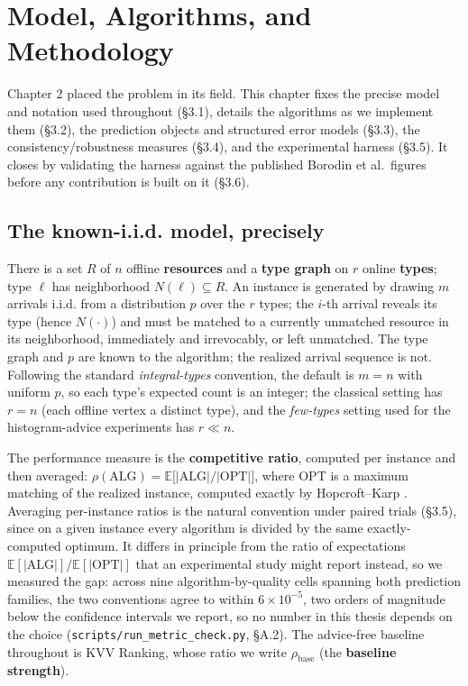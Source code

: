 \chapter{Model, Algorithms, and
Methodology}

Chapter 2 placed the problem in its field. This chapter fixes the
precise model and notation used throughout (§3.1), details the
algorithms as we implement them (§3.2), the prediction objects and
structured error models (§3.3), the consistency/robustness measures
(§3.4), and the experimental harness (§3.5). It closes by validating the
harness against the published Borodin et al.~figures before any
contribution is built on it (§3.6).

\section{The known-i.i.d. model,
precisely}

There is a set \(R\) of \(n\) offline \textbf{resources} and a
\textbf{type graph} on \(r\) online \textbf{types}; type \(\ell\) has
neighborhood \(N(\ell)\subseteq R\). An instance is generated by drawing
\(m\) arrivals i.i.d. from a distribution \(p\) over the \(r\) types;
the \(i\)-th arrival reveals its type (hence \(N(\cdot)\)) and must be
matched to a currently unmatched resource in its neighborhood,
immediately and irrevocably, or left unmatched. The type graph and \(p\)
are known to the algorithm; the realized arrival sequence is not.
Following the standard \emph{integral-types} convention, the default is
\(m=n\) with uniform \(p\), so each type's expected count is an integer;
the classical setting has \(r=n\) (each offline vertex a distinct type),
and the \emph{few-types} setting used for the histogram-advice
experiments has \(r\ll n\).

The performance measure is the \textbf{competitive ratio}, computed per
instance and then averaged:
\(\rho(\mathrm{ALG}) = \mathbb E\bigl[|\mathrm{ALG}|/|\mathrm{OPT}|\bigr]\),
where \(\mathrm{OPT}\) is a maximum matching of the realized instance,
computed exactly by Hopcroft--Karp \autocite{hopcroftkarp1973}.
Averaging per-instance ratios is the natural convention under paired
trials (§3.5), since on a given instance every algorithm is divided by
the same exactly-computed optimum. It differs in principle from the
ratio of expectations
\(\mathbb E[|\mathrm{ALG}|]/\mathbb E[|\mathrm{OPT}|]\) that an
experimental study might report instead, so we measured the gap: across
nine algorithm-by-quality cells spanning both prediction families, the
two conventions agree to within \(6\times10^{-5}\), two orders of
magnitude below the confidence intervals we report, so no number in this
thesis depends on the choice (\texttt{scripts/run\_metric\_check.py},
§A.2). The advice-free baseline throughout is KVV Ranking, whose ratio
we write \(\rho_{\mathrm{base}}\) (the \textbf{baseline strength}).

